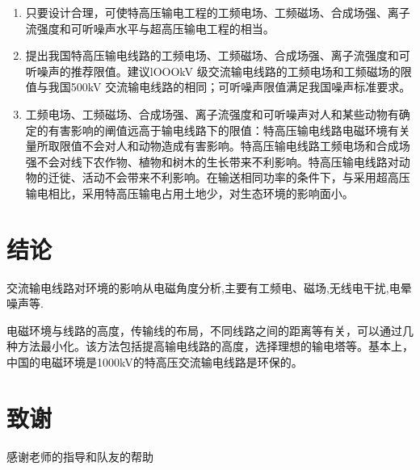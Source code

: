 \documentclass{ctexart} %
\begin{document}
\begin{enumerate}

\item 
只要设计合理，可使特高压输电工程的工频电场、工频磁场、合成场强、离子流强度和可听噪声水平与超高压输电工程的相当。
\item 
提出我国特高压输电线路的工频电场、工频磁场、合成场强、离子流强度和可听噪声的推荐限值。建议lOOOkV 级交流输电线路的工频电场和工频磁场的限值与我国500kV 交流输电线路的相同；可听噪声限值满足我国噪声标准要求。
\item 
工频电场、工频磁场、合成场强、离子流强度和可听噪声对人和某些动物有确定的有害影响的阐值远高于输电线路下的限值：特高压输电线路电磁环境有关量所取限值不会对人和动物造成有害影响。特高压输电线路工频电场和合成场强不会对线下农作物、植物和树木的生长带来不利影响。特高压输电线路对动物的迁徙、活动不会带来不利影响。在输送相同功率的条件下，与采用超高压输电相比，采用特高压输电占用土地少，对生态环境的影响面小。

\end{enumerate}

\section{结论}
交流输电线路对环境的影响从电磁角度分析,主要有工频电、磁场,无线电干扰,电晕噪声等.

电磁环境与线路的高度，传输线的布局，不同线路之间的距离等有关，可以通过几种方法最小化。该方法包括提高输电线路的高度，选择理想的输电塔等。基本上，中国的电磁环境是1000kV的特高压交流输电线路是环保的。


\section{致谢}

感谢老师的指导和队友的帮助~





\end{document}

